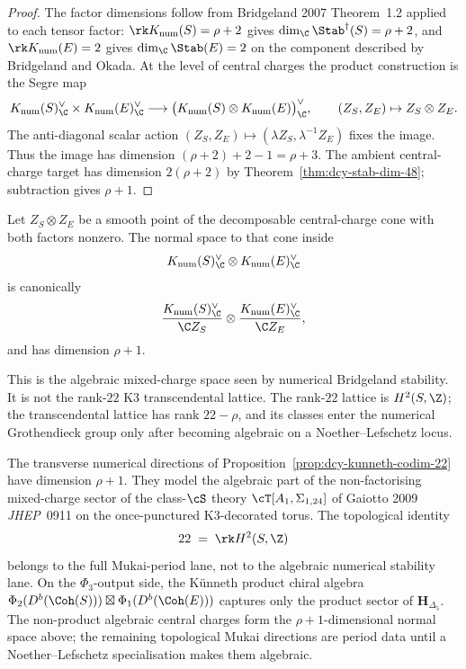 \begin{proof}
The factor dimensions follow from Bridgeland 2007 Theorem~1.2 applied to each tensor factor: $\rk K_{\mathrm{num}}(S)=\rho+2$ gives $\dim_\C\Stab^\dagger(S)=\rho+2$, and $\rk K_{\mathrm{num}}(E)=2$ gives $\dim_\C\Stab(E)=2$ on the component described by Bridgeland and Okada. At the level of central charges the product construction is the Segre map
\[
 K_{\mathrm{num}}(S)^\vee_\C \times K_{\mathrm{num}}(E)^\vee_\C
 \longrightarrow
 \bigl(K_{\mathrm{num}}(S)\otimes K_{\mathrm{num}}(E)\bigr)^\vee_\C,
 \qquad
 (Z_S,Z_E)\mapsto Z_S\otimes Z_E.
\]
The anti-diagonal scalar action $(Z_S,Z_E)\mapsto (\lambda Z_S,\lambda^{-1}Z_E)$ fixes the image. Thus the image has dimension $(\rho+2)+2-1=\rho+3$. The ambient central-charge target has dimension $2(\rho+2)$ by Theorem~\ref{thm:dcy-stab-dim-48}; subtraction gives $\rho+1$.
\end{proof}

\begin{proposition}
\label{prop:dcy-non-kunneth-witnesses}
Let $Z_S\otimes Z_E$ be a smooth point of the decomposable central-charge cone with both factors nonzero. The normal space to that cone inside
\[
 K_{\mathrm{num}}(S)^\vee_\C\otimes K_{\mathrm{num}}(E)^\vee_\C
\]
is canonically
\[
 \frac{K_{\mathrm{num}}(S)^\vee_\C}{\C Z_S}
 \otimes
 \frac{K_{\mathrm{num}}(E)^\vee_\C}{\C Z_E},
\]
and has dimension $\rho+1$.

This is the algebraic mixed-charge space seen by numerical Bridgeland stability. It is not the rank-$22$ K3 transcendental lattice. The rank-$22$ lattice is $H^2(S,\Z)$; the transcendental lattice has rank $22-\rho$, and its classes enter the numerical Grothendieck group only after becoming algebraic on a Noether--Lefschetz locus.
\end{proposition}

\begin{remark}
\label{rem:dcy-class-s-mixed-charge}
The transverse numerical directions of Proposition~\ref{prop:dcy-kunneth-codim-22} have dimension $\rho+1$. They model the algebraic part of the non-factorising mixed-charge sector of the class-$\cS$ theory $\cT[A_1, \Sigma_{1,24}]$ of Gaiotto 2009 \emph{JHEP}~0911 on the once-punctured K3-decorated torus. The topological identity
\[
 22 \;=\; \rk H^2(S,\Z)
\]
belongs to the full Mukai-period lane, not to the algebraic numerical stability lane. On the $\Phi_3$-output side, the K\"unneth product chiral algebra $\Phi_2(D^b(\Coh(S))) \boxtimes \Phi_1(D^b(\Coh(E)))$ captures only the product sector of $\mathbf{H}_{\Delta_5}$. The non-product algebraic central charges form the $\rho+1$-dimensional normal space above; the remaining topological Mukai directions are period data until a Noether--Lefschetz specialisation makes them algebraic.
\end{remark}

